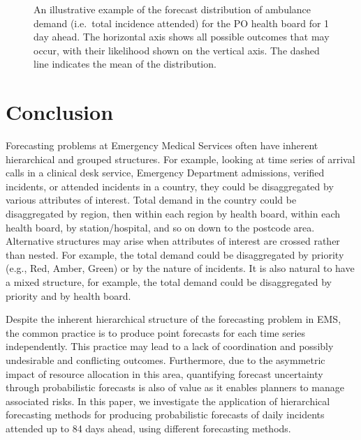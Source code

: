 \documentclass[
  authoryear,
  preprint,
  3p]{elsarticle}
\begin{document}
\begin{figure}[H]


\caption{\label{fig-forecast-density}An illustrative example of the
forecast distribution of ambulance demand (i.e.~total incidence
attended) for the PO health board for 1 day ahead. The horizontal axis
shows all possible outcomes that may occur, with their likelihood shown
on the vertical axis. The dashed line indicates the mean of the
distribution.}

\end{figure}%

\section{Conclusion}\label{sec-conclusion}

Forecasting problems at Emergency Medical Services often have inherent
hierarchical and grouped structures. For example, looking at time series
of arrival calls in a clinical desk service, Emergency Department
admissions, verified incidents, or attended incidents in a country, they
could be disaggregated by various attributes of interest. Total demand
in the country could be disaggregated by region, then within each region
by health board, within each health board, by station/hospital, and so
on down to the postcode area. Alternative structures may arise when
attributes of interest are crossed rather than nested. For example, the
total demand could be disaggregated by priority (e.g., Red, Amber,
Green) or by the nature of incidents. It is also natural to have a mixed
structure, for example, the total demand could be disaggregated by
priority and by health board.

Despite the inherent hierarchical structure of the forecasting problem
in EMS, the common practice is to produce point forecasts for each time
series independently. This practice may lead to a lack of coordination
and possibly undesirable and conflicting outcomes. Furthermore, due to
the asymmetric impact of resource allocation in this area, quantifying
forecast uncertainty through probabilistic forecasts is also of value as
it enables planners to manage associated risks. In this paper, we
investigate the application of hierarchical forecasting methods for
producing probabilistic forecasts of daily incidents attended up to 84
days ahead, using different forecasting methods.
\end{document}
